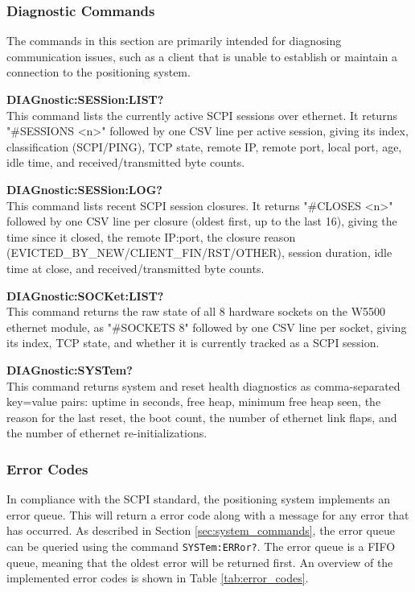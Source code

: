 \subsubsection{Diagnostic Commands}

The commands in this section are primarily intended for diagnosing communication issues, such as a client that is unable to establish or maintain a connection to the positioning system.

\textbf{DIAGnostic:SESSion:LIST?} \\
This command lists the currently active SCPI sessions over ethernet. It returns "\#SESSIONS <n>" followed by one CSV line per active session, giving its index, classification (SCPI/PING), TCP state, remote IP, remote port, local port, age, idle time, and received/transmitted byte counts.

\textbf{DIAGnostic:SESSion:LOG?} \\
This command lists recent SCPI session closures. It returns "\#CLOSES <n>" followed by one CSV line per closure (oldest first, up to the last 16), giving the time since it closed, the remote IP:port, the closure reason (EVICTED\_BY\_NEW/CLIENT\_FIN/RST/OTHER), session duration, idle time at close, and received/transmitted byte counts.

\textbf{DIAGnostic:SOCKet:LIST?} \\
This command returns the raw state of all 8 hardware sockets on the W5500 ethernet module, as "\#SOCKETS 8" followed by one CSV line per socket, giving its index, TCP state, and whether it is currently tracked as a SCPI session.

\textbf{DIAGnostic:SYSTem?} \\
This command returns system and reset health diagnostics as comma-separated key=value pairs: uptime in seconds, free heap, minimum free heap seen, the reason for the last reset, the boot count, the number of ethernet link flaps, and the number of ethernet re-initializations.

\subsubsection{Error Codes}
In compliance with the SCPI standard, the positioning system implements an error queue. This will return a error code along with a message for any error that has occurred. As described in Section \ref{sec:system_commands}, the error queue can be queried using the command \texttt{SYSTem:ERRor?}. The error queue is a FIFO queue, meaning that the oldest error will be returned first. An overview of the implemented error codes is shown in Table \ref{tab:error_codes}.

